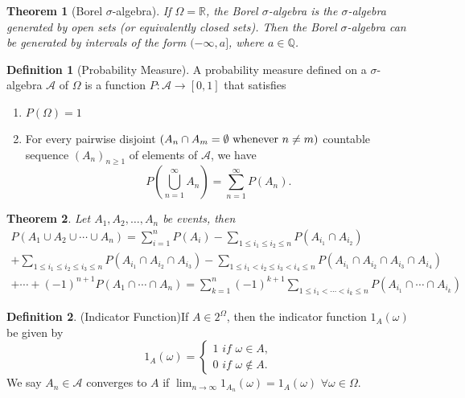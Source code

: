\documentclass{article}
\newtheorem{theorem}{Theorem}[section]
\theoremstyle{definition}
\newtheorem{definition}{Definition}[section]
\theoremstyle{remark}
\begin{document}
\begin{theorem}[Borel $\sigma$-algebra]
If $\Omega = \mathbb{R}$, the Borel $\sigma$-algebra is the $\sigma$-algebra generated by open sets (or equivalently closed sets). Then the Borel $\sigma $-algebra can be generated by intervals of the form $ (-\infty, a] $, where $ a \in \mathbb{Q} $.
\end{theorem}



\begin{definition}[Probability Measure]\label{def:probability}
A probability measure defined on a $ \sigma $-algebra $\mathcal{A}$ of $\Omega$ is a function $ P: \mathcal{A} \to [0,1] $ that satisfies 
\begin{enumerate}
\item $P(\Omega)=1$
\item For every pairwise disjoint $ (A_n \cap A_m = \emptyset \textnormal{ whenever } n \neq m) $ countable sequence $ (A_n)_{n \geq 1} $ of elements of $\mathcal{A}$, we have 
\[
P\left(\bigcup^\infty_{n=1}{A_n}\right) = \sum^\infty_{n=1}{P(A_n)}.
\]
\end{enumerate}
\end{definition}




\begin{theorem}\label{thm:additivity of nondisjoint sets}
Let \(A_1, A_2, \dots, A_n\) be events, then
\begin{gather*} P(A_1 \cup A_2 \cup \cdots \cup A_n) = \sum_{i=1}^{n}{P(A_i)} - \sum_{1 \leq i_1 \leq i_2 \leq n}{P(A_{i_1} \cap A_{i_2})}\\ + \sum_{1 \leq i_1 \leq i_2 \leq i_3 \leq n}{P(A_{i_1} \cap A_{i_2} \cap A_{i_3})} - \sum_{1 \leq i_1 < i_2 \leq i_3 < i_4 \leq n}{P(A_{i_1} \cap A_{i_2} \cap A_{i_3} \cap A_{i_4})} \\ + \cdots + (-1)^{n+1}P(A_1 \cap \cdots \cap A_n)  = \sum_{k=1}^{n}(-1)^{k+1} \sum_{1 \leq i_1 < \cdots < i_k \leq n}{P(A_{i_1} \cap \cdots \cap A_{i_k})} 
\end{gather*}

\end{theorem}




\begin{definition}(Indicator Function)\label{def:indicator function}
If $A \in 2^\Omega$, then the indicator function $1_A(\omega)$ be given by
\[
1_A(\omega) = 
\begin{cases}
1 \textit{ if } \omega \in A,\\
0 \textit{ if } \omega \notin A.
\end{cases}
\]
We say $A_n \in \mathcal{A}$ converges to $A$ if $\lim_{n\to\infty}{1_{A_n}(\omega)} = 1_A(\omega)$ $\forall \omega \in \Omega$.
\end{definition}
\end{document}
